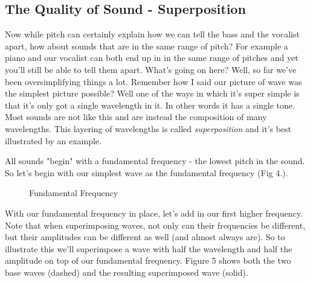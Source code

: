 \documentclass[10pt,a4paper]{article}
\begin{document}
\subsection{The Quality of Sound - Superposition}
Now while pitch can certainly explain how we can tell the bass and the vocalist apart, how about sounds that are in the same range of pitch? For example a piano and our vocalist can both end up in in the same range of pitches and yet you'll still be able to tell them apart. What's going on here? Well, so far we've been oversimplifying things a lot. Remember how I said our picture of wave was the simplest picture possible? Well one of the ways in which it's super simple is that it's only got a single wavelength in it. In other words it has a single tone. Most sounds are not like this and are instead the composition of many wavelengths. This layering of wavelengths is called \textit{superposition} and it's best illustrated by an example. 

All sounds "begin" with a fundamental frequency - the lowest pitch in the sound. So let's begin with our simplest wave as the fundamental frequency (Fig 4.).

\begin{figure}[!htb]
\caption{\label{fig:my-label} Fundamental Frequency}
\end{figure}

With our fundamental frequency in place, let's add in our first higher frequency. Note that when superimposing waves, not only can their frequencies be different, but their amplitudes can be different as well (and almost always are). So to illustrate this we'll superimpose a wave with half the wavelength and half the amplitude on top of our fundamental frequency. Figure 5 shows both the two base waves (dashed) and the resulting superimposed wave (solid).
\end{document}
